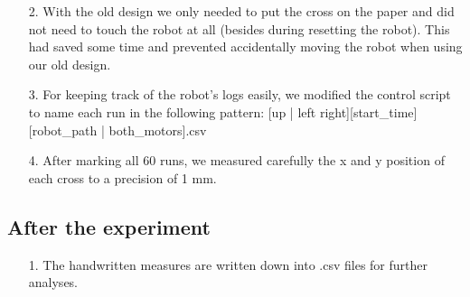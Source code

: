 \begin{itemize}
\begin{itemize}
            \item[2.] With the old design we only needed to put the cross on the paper and did not need to touch the robot at all (besides during resetting the robot). This had saved some time and prevented  accidentally moving the robot when using our old design.
            
            \item[3.] For keeping track of the robot's logs easily, we modified the control script to name each run in the following pattern: [up | left right][start\_time][robot\_path | both\_motors].csv
            
            \item[4.] After marking all 60 runs, we measured carefully the x and y position of each cross to a precision of 1 mm.
        \end{itemize}
        
        \subsection{After the experiment}
        \begin{itemize}
            \item[1.] The handwritten measures are written down into .csv files for further analyses. 
        \end{itemize}
        \end{itemize}
        
        
                
